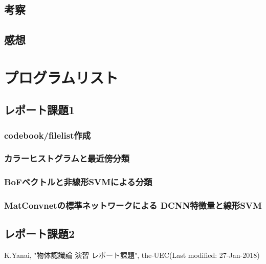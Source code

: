 \documentclass[11pt,a4paper, uplatex]{jsreport}
\begin{document}
\section{考察}
\section{感想}

\appendix
\chapter{プログラムリスト}
\section{レポート課題1}
\subsection{codebook/filelist作成}




\subsection{カラーヒストグラムと最近傍分類}



\subsection{BoFベクトルと非線形SVMによる分類}




\subsection{MatConvnetの標準ネットワークによる DCNN特徴量と線形SVM}



\section{レポート課題2}

\begin{thebibliography}{数字}
   K.Yanai, "物体認識論 演習 レポート課題", the-UEC(Last modified: 27-Jan-2018)
\end{thebibliography}
\end{document}
